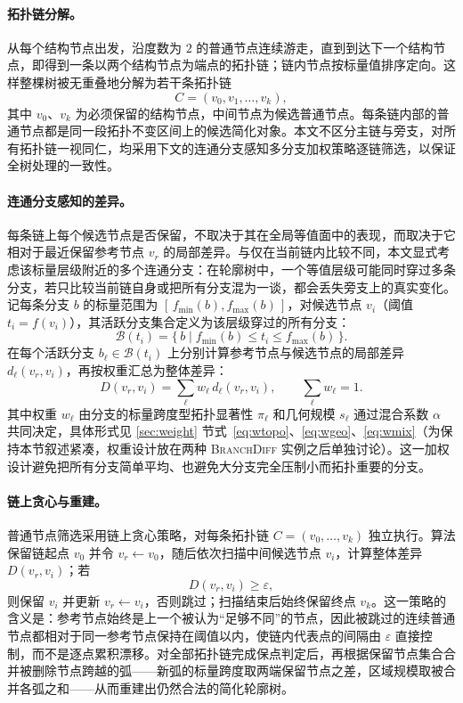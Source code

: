 \documentclass[twocolumn, a4paper, 10pt]{article}
\begin{document}
\paragraph{拓扑链分解。}从每个结构节点出发，沿度数为 $2$ 的普通节点连续游走，直到到达下一个结构节点，即得到一条以两个结构节点为端点的拓扑链；链内节点按标量值排序定向。这样整棵树被无重叠地分解为若干条拓扑链
\begin{equation}
C=(v_0,v_1,\ldots,v_k),
\end{equation}
其中 $v_0$、$v_k$ 为必须保留的结构节点，中间节点为候选普通节点。每条链内部的普通节点都是同一段拓扑不变区间上的候选简化对象。本文不区分主链与旁支，对所有拓扑链一视同仁，均采用下文的连通分支感知多分支加权策略逐链筛选，以保证全树处理的一致性。

\paragraph{连通分支感知的差异。}每条链上每个候选节点是否保留，不取决于其在全局等值面中的表现，而取决于它相对于最近保留参考节点 $v_r$ 的局部差异。与仅在当前链内比较不同，本文显式考虑该标量层级附近的多个连通分支：在轮廓树中，一个等值层级可能同时穿过多条分支，若只比较当前链自身或把所有分支混为一谈，都会丢失旁支上的真实变化。记每条分支 $b$ 的标量范围为 $[\,f_{\min}(b),f_{\max}(b)\,]$，对候选节点 $v_i$（阈值 $t_i=f(v_i)$），其活跃分支集合定义为该层级穿过的所有分支：
\begin{equation}
\mathcal{B}(t_i)=\{\,b\mid f_{\min}(b)\leq t_i\leq f_{\max}(b)\,\}.
\end{equation}
在每个活跃分支 $b_\ell\in\mathcal{B}(t_i)$ 上分别计算参考节点与候选节点的局部差异 $d_\ell(v_r,v_i)$，再按权重汇总为整体差异：
\begin{equation}
D(v_r,v_i)=\sum_{\ell}w_\ell\, d_\ell(v_r,v_i),
\qquad \sum_{\ell}w_\ell=1.
\label{eq:aggregate}
\end{equation}
其中权重 $w_\ell$ 由分支的标量跨度型拓扑显著性 $\pi_\ell$ 和几何规模 $s_\ell$ 通过混合系数 $\alpha$ 共同决定，具体形式见 \ref{sec:weight} 节式~\eqref{eq:wtopo}、\eqref{eq:wgeo}、\eqref{eq:wmix}（为保持本节叙述紧凑，权重设计放在两种 \textsc{BranchDiff} 实例之后单独讨论）。这一加权设计避免把所有分支简单平均、也避免大分支完全压制小而拓扑重要的分支。

\paragraph{链上贪心与重建。}普通节点筛选采用链上贪心策略，对每条拓扑链 $C=(v_0,\ldots,v_k)$ 独立执行。算法保留链起点 $v_0$ 并令 $v_r\leftarrow v_0$，随后依次扫描中间候选节点 $v_i$，计算整体差异 $D(v_r,v_i)$；若
\begin{equation}
D(v_r,v_i)\geq \varepsilon,
\end{equation}
则保留 $v_i$ 并更新 $v_r\leftarrow v_i$，否则跳过；扫描结束后始终保留终点 $v_k$。这一策略的含义是：参考节点始终是上一个被认为“足够不同”的节点，因此被跳过的连续普通节点都相对于同一参考节点保持在阈值以内，使链内代表点的间隔由 $\varepsilon$ 直接控制，而不是逐点累积漂移。对全部拓扑链完成保点判定后，再根据保留节点集合合并被删除节点跨越的弧——新弧的标量跨度取两端保留节点之差，区域规模取被合并各弧之和——从而重建出仍然合法的简化轮廓树。
\end{document}
